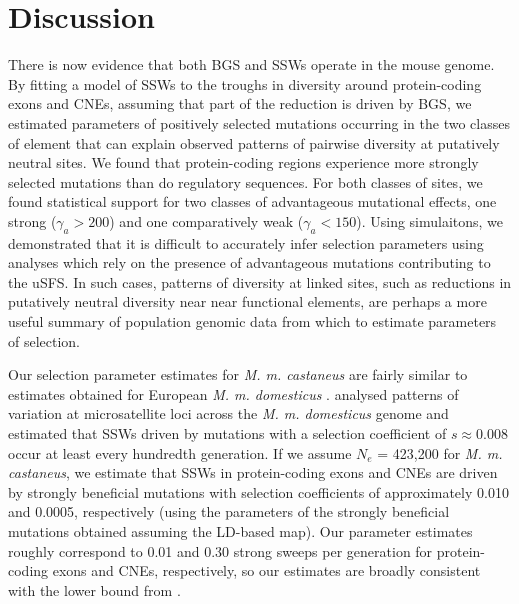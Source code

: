 {%
%
%

\section{Discussion}

	There is now evidence that both BGS and SSWs operate in the mouse genome. By fitting a model of SSWs to the troughs in diversity around protein-coding exons and CNEs, assuming that part of the reduction is driven by BGS, we estimated parameters of positively selected mutations occurring in the two classes of element that can explain observed patterns of pairwise diversity at putatively neutral sites. We found that protein-coding regions experience more strongly selected mutations than do regulatory sequences. For both classes of sites, we found statistical support for two classes of advantageous mutational effects, one strong ($\gamma_a > 200$) and one comparatively weak ($\gamma_a < 150$). Using simulaitons, we demonstrated that it is difficult to accurately infer selection parameters using analyses which rely on the presence of advantageous mutations contributing to the uSFS. In such cases, patterns of diversity at linked sites, such as reductions in putatively neutral diversity near near functional elements, are perhaps a more useful summary of population genomic data from which to estimate parameters of selection.
	
	Our selection parameter estimates for \textit{M. m. castaneus} are fairly similar to estimates obtained for European \textit{M. m. domesticus} \citep{RN355}. \cite{RN355} analysed patterns of variation at microsatellite loci across the \textit{M. m. domesticus} genome and estimated that SSWs driven by mutations with a selection coefficient of $s \approx 0.008$ occur at least every hundredth generation. If we assume $N_e$ = 423,200 for \textit{M. m. castaneus}, we estimate that SSWs in protein-coding exons and CNEs are driven by strongly beneficial mutations with selection coefficients of approximately 0.010 and 0.0005, respectively (using the parameters of the strongly beneficial mutations obtained assuming the LD-based map). Our parameter estimates roughly correspond to  0.01 and 0.30 strong sweeps per generation for protein-coding exons and CNEs, respectively, so our estimates are broadly consistent with the lower bound from \cite{RN355}.
	
}
